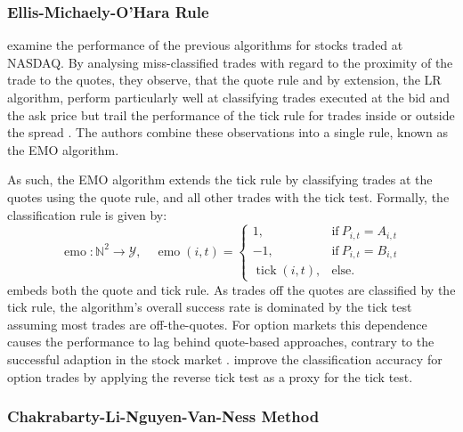 \subsubsection{Ellis-Michaely-O'Hara
    Rule}\label{sec:ellis-michaely-ohara-rule}

\textcite[][536]{ellisAccuracyTradeClassification2000} examine the performance of the previous algorithms for stocks traded at \gls{NASDAQ}. By analysing miss-classified trades with regard to the proximity of the trade to the quotes, they observe, that the quote rule and by extension, the \gls{LR} algorithm, perform particularly well at classifying trades executed at the bid and the ask price but trail the performance of the tick rule for trades inside or outside the spread \autocite[][535--536]{ellisAccuracyTradeClassification2000}. The authors combine these observations into a single rule, known as the \gls{EMO} algorithm.

As such, the \gls{EMO} algorithm extends the tick rule by classifying trades at the quotes using the quote rule, and all other trades with the tick test. Formally, the classification rule is given by:
\begin{equation}
    \operatorname{emo} \colon \mathbb{N}^2 \to \mathcal{Y}, \quad
    \operatorname{emo}(i, t)=
    \begin{cases}
        1,                         & \mathrm{if}\ P_{i, t} = A_{i, t} \\
        -1,                        & \mathrm{if}\ P_{i, t} = B_{i, t} \\
        \operatorname{tick}(i, t), & \mathrm{else}.
    \end{cases}
    \label{eq:emo-rule}
\end{equation}
 embeds both the quote and tick rule. As trades off the quotes are classified by the tick rule, the algorithm's overall success rate is dominated by the tick test assuming most trades are off-the-quotes. For option markets \autocites[cp.][891]{savickasInferringDirectionOption2003}[][21]{grauerOptionTradeClassification2022} this dependence causes the performance to lag behind quote-based approaches, contrary to the successful adaption in the stock market \autocites[][541]{ellisAccuracyTradeClassification2000}[][3818]{chakrabartyTradeClassificationAlgorithms2007}. \textcite[][31--35]{grauerOptionTradeClassification2022} improve the classification accuracy for option trades by applying the reverse tick test as a proxy for the tick test.

\subsubsection{Chakrabarty-Li-Nguyen-Van-Ness
    Method}\label{sec:chakarabarty-li-nguyen-van-ness-method}


